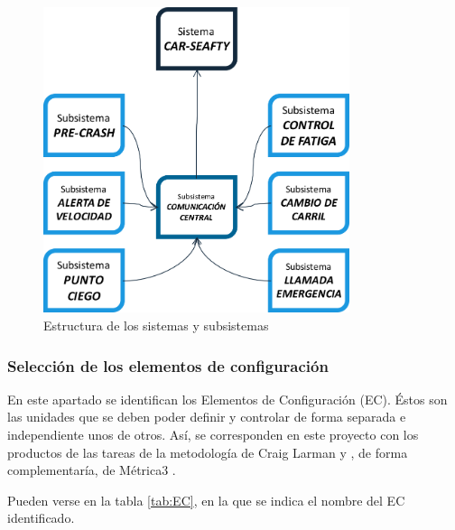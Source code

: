 \begin{figure}[H]
\begin{center}
\includegraphics[width=0.8\textwidth]{./img/relSubsystems}
\end{center}
\caption{Estructura de los sistemas y subsistemas}
\label{img:relSys}
\end{figure}



\subsubsection{Selección de los elementos de configuración}
\par En este apartado se identifican los Elementos de Configuración (EC). Éstos son las unidades que se deben poder definir y controlar de forma separada e independiente unos de otros. Así, se corresponden en este proyecto con los productos de las tareas de la metodología de Craig Larman \cite{ART:CraigLarman} y , de forma complementaría, de Métrica3 \cite{WEB:Metrica3}.
\par Pueden verse en la tabla \ref{tab:EC}, en la que se indica el nombre del EC identificado.


